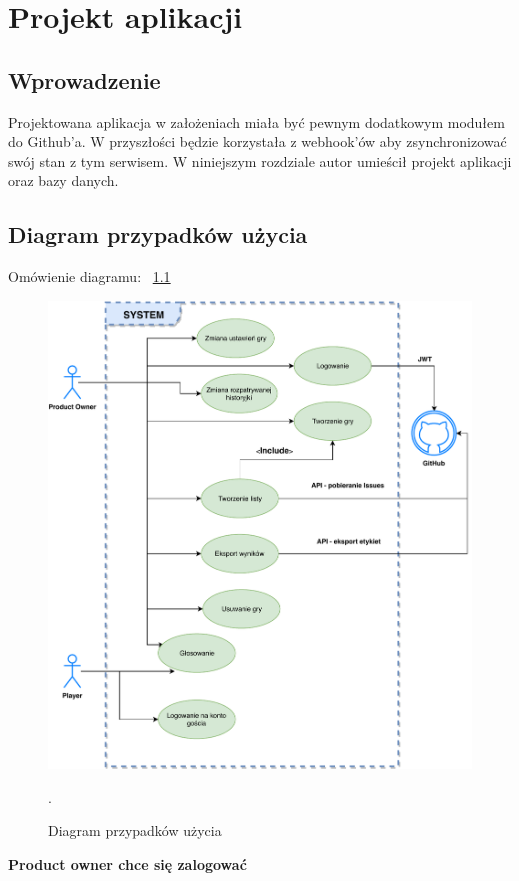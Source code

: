 \chapter{Projekt aplikacji}

\section{Wprowadzenie}

Projektowana aplikacja w założeniach miała być pewnym dodatkowym modułem do Github'a.
W przyszłości będzie korzystała z webhook'ów aby zsynchronizować swój stan z tym serwisem.
W niniejszym rozdziale autor umieścił projekt aplikacji oraz bazy danych.

\section{Diagram przypadków użycia}

Omówienie diagramu: 
~\ref{rys:useCase}

\begin{figure}[H]
	\centering\includegraphics[width=.9\textwidth]{img/useCase}
	\caption{Diagram przypadków użycia}.
	\label{rys:useCase}
\end{figure}

\textbf{Product owner chce się zalogować}

